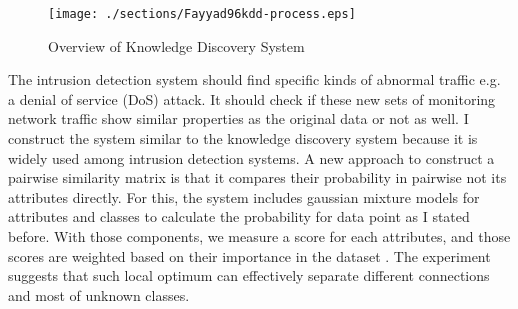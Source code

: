 \begin{figure}[htb2]
\begin{center}
\texttt{[image: ./sections/Fayyad96kdd-process.eps]}
\end{center}
\caption{Overview of Knowledge Discovery System}
\label{fig:refSingleRobot1}
\end{figure}
The intrusion detection system should find specific kinds of abnormal traffic e.g. a denial of service (DoS) attack. 
It should check if these new sets of monitoring network traffic show similar properties as the original data or not as well. 
I construct the system similar to the knowledge discovery system \cite{fayyad96} because it is widely used among intrusion detection systems. 
A new approach to construct a pairwise similarity matrix is that it compares their probability in pairwise not its attributes directly. 
For this, the system includes gaussian mixture models for attributes and classes to calculate the probability for data point as I stated before. 
With those components, we measure a score for each attributes, and those scores are weighted based on their importance in the dataset \cite{kayacik05}.
The experiment suggests that such local optimum can effectively separate different connections and most of unknown classes. 

